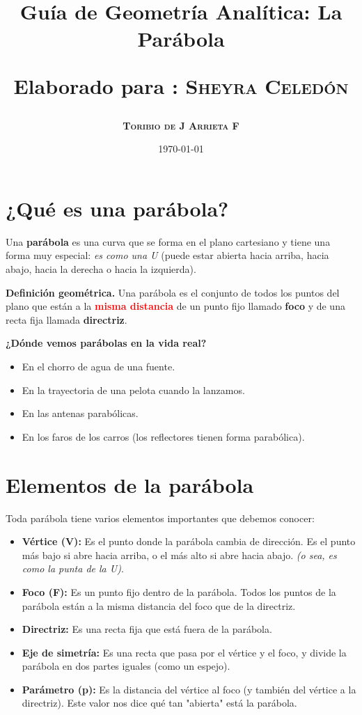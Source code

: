 \documentclass[12pt,a4paper]{article}
\title{\Large Guía de Geometría Analítica: La Parábola

\small{Elaborado para : \textsc{\bf{Sheyra Celedón}}}}
\author{\bf{\textsc{Toribio de J Arrieta F}}}
\date{\today}
\begin{document}
	\maketitle

	\section{¿Qué es una parábola?}

	Una \textbf{parábola} es una curva que se forma en el plano cartesiano y tiene una forma muy especial: \emph{es como una U} (puede estar abierta hacia arriba, hacia abajo, hacia la derecha o hacia la izquierda).

	\bigskip

	\textbf{Definición geométrica.} Una parábola es el conjunto de todos los puntos del plano que están a la \textcolor{red}{\textbf{misma distancia}} de un punto fijo llamado \textbf{foco} y de una recta fija llamada \textbf{directriz}.

	\bigskip

	\textbf{¿Dónde vemos parábolas en la vida real?}
	\begin{itemize}
		\item En el chorro de agua de una fuente.
		\item En la trayectoria de una pelota cuando la lanzamos.
		\item En las antenas parabólicas.
		\item En los faros de los carros (los reflectores tienen forma parabólica).
	\end{itemize}

	\section{Elementos de la parábola}

	Toda parábola tiene varios elementos importantes que debemos conocer:

	\begin{itemize}
		\item \textbf{Vértice (V):} Es el punto donde la parábola cambia de dirección. Es el punto más bajo si abre hacia arriba, o el más alto si abre hacia abajo. \emph{(o sea, es como la punta de la U)}.

		\item \textbf{Foco (F):} Es un punto fijo dentro de la parábola. Todos los puntos de la parábola están a la misma distancia del foco que de la directriz.

		\item \textbf{Directriz:} Es una recta fija que está fuera de la parábola.

		\item \textbf{Eje de simetría:} Es una recta que pasa por el vértice y el foco, y divide la parábola en dos partes iguales (como un espejo).

		\item \textbf{Parámetro (p):} Es la distancia del vértice al foco (y también del vértice a la directriz). Este valor nos dice qué tan "abierta" está la parábola.
	\end{itemize}
\end{document}
